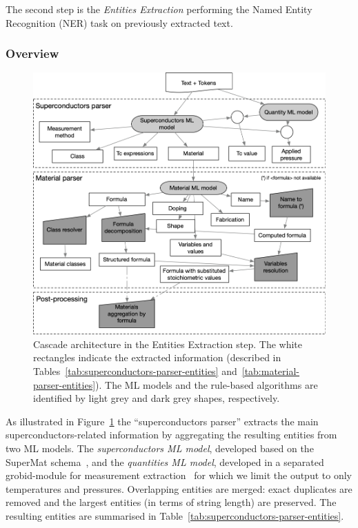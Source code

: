 \documentclass{article}
\begin{document}
The second step is the \textit{Entities Extraction} performing the Named Entity Recognition (NER) task on previously extracted text. 

\subsubsection{Overview}

\begin{figure}[ht]
\includegraphics[width=\textwidth]{extraction-schema-4}
\caption{\label{fig:extraction-ml-models-cascade-architecture} Cascade architecture in the Entities Extraction step. The white rectangles indicate the extracted information (described in Tables~\ref{tab:superconductors-parser-entities} and~\ref{tab:material-parser-entities}). 
The ML models and the rule-based algorithms are identified by light grey and dark grey shapes, respectively.}
\end{figure}

As illustrated in Figure~\ref{fig:extraction-ml-models-cascade-architecture} the ``superconductors parser'' extracts the main superconductors-related information by aggregating the resulting entities from two ML models. 
The \textit{superconductors ML model}, developed based on the SuperMat schema~\cite{foppiano2021supermat}, and the \textit{quantities ML model}, developed in a separated grobid-module for measurement extraction~\cite{foppiano2019quantities} for which we limit the output to only temperatures and pressures.
Overlapping entities are merged: exact duplicates are removed and the largest entities (in terms of string length) are preserved.
The resulting entities are summarised in Table~\ref{tab:superconductors-parser-entities}.
\end{document}
